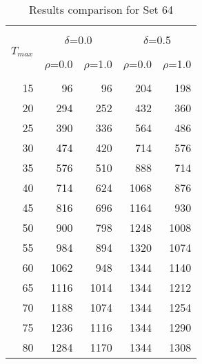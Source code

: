 \begin{table}[!htb]
\centering
{\renewcommand{\tabcolsep}{12pt}
\caption{Results comparison for Set 64\label{table:set64}}
\vspace{-0.75em}
\begin{tabular}{rrrrr}
\hline \\ [-1.8ex]
 \multirow{3}{*}{$T_{max}$}& \multicolumn{2}{c}{$\delta$=0.0}& \multicolumn{2}{c}{$\delta$=0.5} {\smallskip} \\  \cmidrule(lr){2-3} \cmidrule(lr){4-5} \\ [-1.8ex] 
 & $\rho$=0.0& $\rho$=1.0& $\rho$=0.0& $\rho$=1.0 \\ [-1.8ex] \\ \hline
15 & 96 & 96 & 204 & 198 \\
20 & 294 & 252 & 432 & 360 \\
25 & 390 & 336 & 564 & 486 \\
30 & 474 & 420 & 714 & 576 \\
35 & 576 & 510 & 888 & 714 \\
40 & 714 & 624 & 1068 & 876 \\
45 & 816 & 696 & 1164 & 930 \\
50 & 900 & 798 & 1248 & 1008 \\
55 & 984 & 894 & 1320 & 1074 \\
60 & 1062 & 948 & 1344 & 1140 \\
65 & 1116 & 1014 & 1344 & 1212 \\
70 & 1188 & 1074 & 1344 & 1254 \\
75 & 1236 & 1116 & 1344 & 1290 \\
80 & 1284 & 1170 & 1344 & 1308 \\
 \hline
\end{tabular}
}
\end{table}
